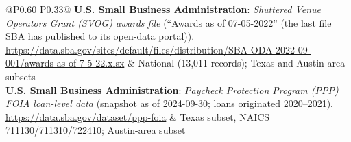 {\begin{longtable}{@{}P{0.60\textwidth} P{0.33\textwidth}@{}}
\textbf{U.S. Small Business Administration}: \textit{Shuttered Venue Operators Grant (SVOG) awards file} (“Awards as of 07-05-2022” (the last file SBA has published to its open-data portal)). \url{https://data.sba.gov/sites/default/files/distribution/SBA-ODA-2022-09-001/awards-as-of-7-5-22.xlsx} & National (13,011 records); Texas and Austin-area subsets \\
\textbf{U.S. Small Business Administration}: \textit{Paycheck Protection Program (PPP) FOIA loan-level data} (snapshot as of 2024-09-30; loans originated 2020--2021). \url{https://data.sba.gov/dataset/ppp-foia} & Texas subset, NAICS 711130/711310/722410; Austin-area subset \\
\end{longtable}
}
